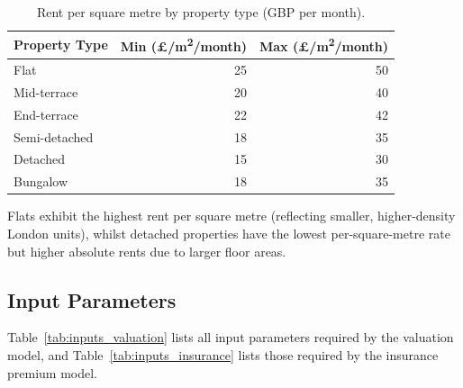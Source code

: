 \documentclass[11pt,a4paper]{article}
\begin{document}
\begin{table}[H]
\centering
\caption{Rent per square metre by property type (GBP per month).}
\label{tab:rent_per_sqm}
\begin{tabular}{lrr}
\toprule
\textbf{Property Type} & \textbf{Min (\pounds/m\textsuperscript{2}/month)} & \textbf{Max (\pounds/m\textsuperscript{2}/month)} \\
\midrule
Flat            & 25 & 50 \\
Mid-terrace     & 20 & 40 \\
End-terrace     & 22 & 42 \\
Semi-detached   & 18 & 35 \\
Detached        & 15 & 30 \\
Bungalow        & 18 & 35 \\
\bottomrule
\end{tabular}
\end{table}

\noindent Flats exhibit the highest rent per square metre (reflecting
smaller, higher-density London units), whilst detached properties have
the lowest per-square-metre rate but higher absolute rents due to
larger floor areas.


\mkminputs

\subsection{Input Parameters}

Table~\ref{tab:inputs_valuation} lists all input parameters required by
the valuation model, and Table~\ref{tab:inputs_insurance} lists those
required by the insurance premium model.
\end{document}
